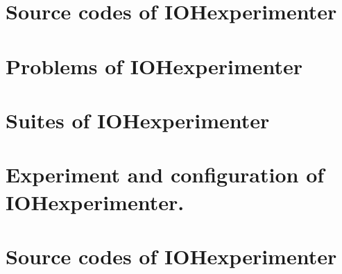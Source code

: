 \let\mypdfximage\pdfximage\def\pdfximage{\immediate\mypdfximage}\documentclass[twoside]{book}
\newcommand{\+}{\discretionary{\mbox{\scriptsize$\hookleftarrow$}}{}{}}
\begin{document}
\chapter{Source codes of I\+O\+Hexperimenter}
\label{md__home_aaziz-alaoui__documents__p_f_e__x__paradis_e_o__resources_paradiseo-master_eo_src__i_o_h__template__r_e_a_d_m_e}

\chapter{Problems of I\+O\+Hexperimenter}
\label{md__home_aaziz-alaoui__documents__p_f_e__x__paradis_e_o__resources_paradiseo-master_eo_src__i_o_2b5134b4d99bfa166d32df9b9f325a00}

\chapter{Suites of I\+O\+Hexperimenter}
\label{md__home_aaziz-alaoui__documents__p_f_e__x__paradis_e_o__resources_paradiseo-master_eo_src__i_o_835250c2fdb66f4e146e8e527fc9ac72}

\chapter{Experiment and configuration of I\+O\+Hexperimenter.}
\label{md__home_aaziz-alaoui__documents__p_f_e__x__paradis_e_o__resources_paradiseo-master_eo_src__i_o_f4476c9a4822717aa9767b196190281c}

\chapter{Source codes of I\+O\+Hexperimenter}
\label{md__home_aaziz-alaoui__documents__p_f_e__x__paradis_e_o__resources_paradiseo-master_eo_src__i_o_09b73ae8523273b2cc17c2c1bd2116c6}

\end{document}
